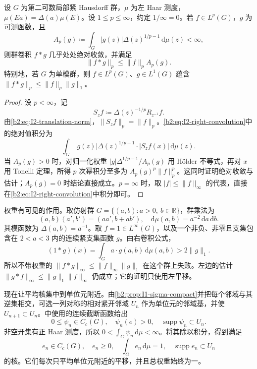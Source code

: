 \begin{proposition}[右卷积的加权估计]
\label{b2:prop:I2-right-young}
设 \(G\) 为第二可数局部紧 Hausdorff 群，\(\mu\) 为左 Haar 测度，\(\mu(Ea)=\Delta(a)\mu(E)\)。设 \(1\le p\le\infty\)，约定 \(1/\infty=0\)。若 \(f\in L^p(G)\)，\(g\) 为可测函数，且
\[
 A_p(g)\coloneqq\int_G|g(z)|\Delta(z)^{1/p-1}\,\mathrm d\mu(z)<\infty,
\]
则群卷积 \(f*g\) 几乎处处绝对收敛，并满足
\[
 \|f*g\|_p\le\|f\|_p A_p(g).
\]
特别地，若 \(G\) 为单模群，则 \(f\in L^p(G)\)、\(g\in L^1(G)\) 蕴含 \(\|f*g\|_p\le\|f\|_p\|g\|_1\)。
\end{proposition}
\begin{proof}
设 \(p<\infty\)，记
\[
 S_zf\coloneqq\Delta(z)^{-1/p}R_{z^{-1}}f.
\]
由\eqref{b2:eq:I2-translation-norm}，\(\|S_zf\|_p=\|f\|_p\)。\eqref{b2:eq:I2-right-convolution}中的绝对值积分为
\[
 \int_G |g(z)|\Delta(z)^{1/p-1}\cdot |S_zf(x)|\,\mathrm d\mu(z).
\]
当 \(A_p(g)>0\) 时，对归一化权重 \(|g|\Delta^{1/p-1}/A_p(g)\) 用 Hölder 不等式，再对 \(x\) 用 Tonelli 定理，所得 \(p\) 次幂积分至多为 \(A_p(g)^p\|f\|_p^p\)。这同时证明绝对收敛与估计；\(A_p(g)=0\) 时结论直接成立。\(p=\infty\) 时，取 \(|f|\le\|f\|_\infty\) 的代表，直接在\eqref{b2:eq:I2-right-convolution}中积分即可。
\end{proof}

权重有可见的作用。取仿射群 \(G=\{(a,b):a>0,\ b\in\mathbb R\}\)，群乘法为
\[
 (a,b)(a',b')=(aa',b+ab'),\quad
 \mathrm d\mu(a,b)=a^{-2}\,\mathrm da\,\mathrm db.
\]
其模函数为 \(\Delta(a,b)=a^{-1}\)。取 \(f=1\in L^\infty(G)\)，以及一个非负、非零且支集包含在 \(2<a<3\) 内的连续紧支集函数 \(g\)。由右卷积公式，
\[
 (1*g)(x)=\int_G a\cdot g(a,b)\,\mathrm d\mu(a,b)
 >2\|g\|_1.
\]
所以不带权重的 \(\|f*g\|_\infty\le\|f\|_\infty\|g\|_1\) 在这个群上失败。左边的估计 \(\|g*f\|_\infty\le\|g\|_1\|f\|_\infty\) 仍成立；它的证明只使用左平移。

现在让平均核集中到单位元附近。由\cref{b2:prop:I1-sigma-compact}并把每个邻域与其逆集相交，可选一列对称的相对紧开邻域 \(U_n\) 作为单位元的邻域基，并使 \(U_{n+1}\subset U_n\)。中使用的连续截断函数给出
\[
 0\le\psi_n\in C_c(G),\quad
 \psi_n(e)>0,\quad \operatorname{supp}\psi_n\subset U_n.
\]
非空开集有正 Haar 测度，所以 \(0<\int_G\psi_n\,\mathrm d\mu<\infty\)。将其除以积分，得到满足
\begin{equation}
\label{b2:eq:I2-positive-kernels}
 e_n\in C_c(G),\quad e_n\ge0,\quad
 \int_G e_n\,\mathrm d\mu=1,\quad
 \operatorname{supp}e_n\subset U_n
\end{equation}
的核。它们每次只平均单位元附近的平移，并且总权重始终为一。

